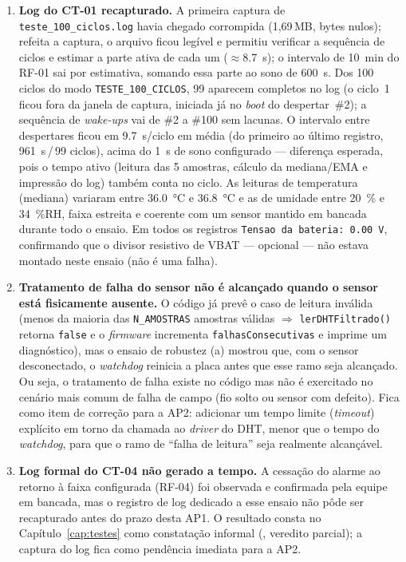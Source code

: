 \begin{enumerate}
  \item \textbf{Log do CT-01 recapturado.} A primeira captura de
    \texttt{teste\_100\_ciclos.log} havia chegado corrompida (1{,}69\,MB,
    bytes nulos); refeita a captura, o arquivo ficou legível e permitiu
    verificar a sequência de ciclos e estimar a parte ativa de cada um
    ($\approx$\SI{8,7}{\second}); o intervalo de \SI{10}{\minute} do RF-01
    sai por estimativa, somando essa parte ao sono de \SI{600}{\second}. Dos 100 ciclos do modo
    \texttt{TESTE\_100\_CICLOS}, 99 aparecem completos no log (o ciclo~1
    ficou fora da janela de captura, iniciada já no \emph{boot} do
    despertar~\#2); a sequência de \emph{wake-ups} vai de \#2 a \#100 sem
    lacunas. O intervalo entre despertares ficou em
    \SI{9,7}{\second}/ciclo em média (do primeiro ao último registro,
    \SI{961}{\second}\,/\,99 ciclos), acima do \SI{1}{\second} de sono
    configurado --- diferença esperada, pois o tempo ativo (leitura das 5
    amostras, cálculo da mediana/EMA e impressão do log) também conta no
    ciclo. As leituras de temperatura (mediana) variaram entre
    \SI{36,0}{\celsius} e \SI{36,8}{\celsius} e as de umidade entre
    \SI{20}{\percent} e \SI{34}{\percent}RH, faixa estreita e coerente com
    um sensor mantido em bancada durante todo o ensaio. Em todos os
    registros \texttt{Tensao da bateria: 0.00 V}, confirmando que o
    divisor resistivo de VBAT --- opcional --- não estava montado neste
    ensaio (não é uma falha).
  \item \textbf{Tratamento de falha do sensor não é alcançado quando o
    sensor está fisicamente ausente.} O código já prevê o caso de leitura
    inválida (menos da maioria das \texttt{N\_AMOSTRAS} amostras válidas
    $\Rightarrow$ \texttt{lerDHTFiltrado()} retorna \texttt{false} e o
    \emph{firmware} incrementa \texttt{falhasConsecutivas} e imprime um
    diagnóstico), mas o ensaio de robustez (a) mostrou que, com o sensor
    desconectado, o \emph{watchdog} reinicia a placa antes que esse ramo
    seja alcançado. Ou seja, o tratamento de falha existe no código mas
    não é exercitado no cenário mais comum de falha de campo (fio solto ou
    sensor com defeito). Fica como item de correção para a AP2: adicionar
    um tempo limite (\emph{timeout}) explícito em torno da chamada ao
    \emph{driver} do DHT, menor que o tempo do \emph{watchdog}, para que o
    ramo de \enquote{falha de leitura} seja realmente alcançável.
  \item \textbf{Log formal do CT-04 não gerado a tempo.} A cessação do
    alarme ao retorno à faixa configurada (RF-04) foi observada e
    confirmada pela equipe em bancada, mas o registro de log dedicado a
    esse ensaio não pôde ser recapturado antes do prazo desta AP1. O
    resultado consta no Capítulo~\ref{cap:testes} como constatação
    informal (, veredito parcial); a captura do log fica como
    pendência imediata para a AP2.
\end{enumerate}

